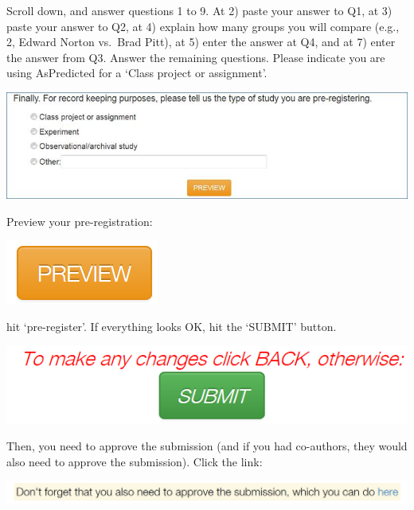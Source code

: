 \documentclass[
  oneside]{krantz}
\begin{document}
Scroll down, and answer questions 1 to 9. At 2) paste your answer to Q1, at 3)
paste your answer to Q2, at 4) explain how many groups you will compare (e.g.,
2, Edward Norton vs.~Brad Pitt), at 5) enter the answer at Q4, and at 7) enter
the answer from Q3. Answer the remaining questions. Please indicate you are
using AsPredicted for a `Class project or assignment'.

\begin{center}\includegraphics[width=1\linewidth]{images/aedb89e7e45561843864302129f6cbd6} \end{center}

Preview your pre-registration:

\begin{center}\includegraphics[width=0.2\linewidth]{images/4fbbec922f482e27aef0dd7f0714afad} \end{center}

hit `pre-register'. If everything looks OK, hit the `SUBMIT' button.

\begin{center}\includegraphics[width=1\linewidth]{images/7aa826d5b815c5aa18b66cfb6bcd30fe} \end{center}

Then, you need to approve the submission (and if you had co-authors, they would
also need to approve the submission). Click the link:

\begin{center}\includegraphics[width=1\linewidth]{images/c7691954684e51c29afa2aead98414c5} \end{center}
\end{document}
